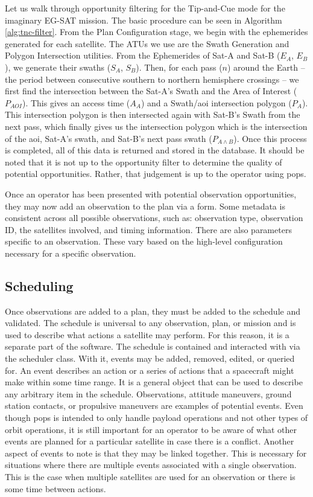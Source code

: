 Let us walk through opportunity filtering for the Tip-and-Cue mode for the
imaginary EG-SAT mission. The basic procedure can be seen in Algorithm
\ref{alg:tnc-filter}. From the Plan Configuration stage, we begin with the
ephemerides generated for each satellite. The ATUs we use are the Swath
Generation and Polygon Intersection utilities. From the Ephemerides of Sat-A
and Sat-B ($E_A$, $E_B$), we generate their swaths ($S_A$, $S_B$). Then, for
each pass ($n$) around the Earth – the period between consecutive southern to
northern hemisphere crossings – we first find the intersection between the
Sat-A’s Swath and the Area of Interest ($P_{AOI}$).  This gives an access time
($A_A$) and a Swath/\gls{aoi} intersection polygon ($P_A$). This intersection
polygon is then intersected again with Sat-B’s Swath from the next pass, which
finally gives us the intersection polygon which is the intersection of the
\gls{aoi}, Sat-A’s swath, and Sat-B’s next pass swath ($P_{A \wedge B}$). Once
this process is completed, all of this data is returned and stored in the
database. It should be noted that it is not up to the opportunity filter to
determine the quality of potential opportunities. Rather, that judgement is up
to the operator using \gls{pops}.

Once an operator has been presented with potential observation opportunities,
they may now add an observation to the plan via a form. Some metadata is
consistent across all possible observations, such as: observation type,
observation ID, the satellites involved, and timing information. There are also
parameters specific to an observation. These vary based on the high-level
configuration necessary for a specific observation. 


\subsection{Scheduling}


Once observations are added to a plan, they must be added to the schedule and
validated. The schedule is universal to any observation, plan, or mission and
is used to describe what actions a satellite may perform. For this reason, it
is a separate part of the software. The schedule is contained and interacted
with via the scheduler class. With it, events may be added, removed, edited, or
queried for. An event describes an action or a series of actions that a
spacecraft might make within some time range. It is a general object that can
be used to describe any arbitrary item in the schedule. Observations, attitude
maneuvers, ground station contacts, or propulsive maneuvers are examples of
potential events. Even though \gls{pops} is intended to only handle payload
operations and not other types of orbit operations, it is still important for
an operator to be aware of what other events are planned for a particular
satellite in case there is a conflict. Another aspect of events to note is that
they may be linked together. This is necessary for situations where there are
multiple events associated with a single observation. This is the case when
multiple satellites are used for an observation or there is some time between
actions.  

